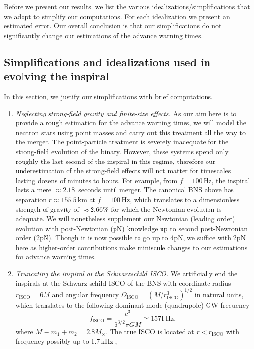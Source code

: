 \documentclass[amsmath,amssymb,aps,floats,amsfonts,notitlepage,superscriptaddress,eqsecnum,nofootinbib,10pt]{revtex4-1}
\newcommand{\f}{\frac}
\newcommand{\be}{\begin{equation}}
\newcommand{\ee}{\end{equation}}
\begin{document}
Before we present our results, we list the various idealizations/simplifications that we adopt to simplify our computations.
For each idealization we present an estimated error. %
Our overall conclusion is that our simplifications do not significantly change our estimations of the advance warning times.%
%
%
%
%
\subsection{Simplifications and idealizations used in evolving the inspiral}\label{sec:idealizations}
In this section, we justify our simplifications with brief computations.
\begin{enumerate}
 \item {\it Neglecting strong-field gravity and finite-size effects.}
As our aim here is to provide a rough estimation for the advance warning times, we will model the neutron stars using point masses and carry out this treatment all the way to the merger. The point-particle treatment is severely inadequate for the strong-field evolution of the binary. However, these systems spend only roughly the last second of the inspiral in this regime, therefore our underestimation of the strong-field effects will not matter for timescales lasting dozens of minutes to hours.
For example, from $f=100\,$Hz, the inspiral lasts a mere $\approx 2.18\,$ seconds until merger. The canonical BNS above has separation $r\approx 155.5\,$km at $f=100\,$Hz, which translates to a dimensionless strength of gravity of $\approx 2.66\%$ for which the Newtonian evolution is adequate.
We will nonetheless supplement our Newtonian (leading order) evolution with post-Newtonian (pN) knowledge up to second post-Newtonian order (2pN). %
Though it is now possible to go up to 4pN, we suffice with 2pN here as higher-order contributions make miniscule changes to our estimations for advance warning times. 
%
\item {\it Truncating the inspiral at the Schwarzschild ISCO.}
We artificially end the inspirals at the Schwarz-schild ISCO of the BNS with coordinate radius $r_\text{ISCO} = 6M$ and angular frequency $\Omega_\text{ISCO} = (M/r^3_\text{ISCO})^{1/2}$ in natural units, which translates to the following dominant-mode (quadrupole) GW frequency
\be
f_\text{ISCO} = \f{c^3}{6^{3/2}\pi G M} \simeq 1571\,\text{Hz} \label{eq:f_isco},
\ee
where $M \equiv m_1+m_2 = 2.8 M_\odot$. The true ISCO is located at $r< r_\text{ISCO}$ with frequency possibly up to 1.7\,kHz \cite{Marronetti:2003hx}, 

\end{enumerate}
\end{document}
